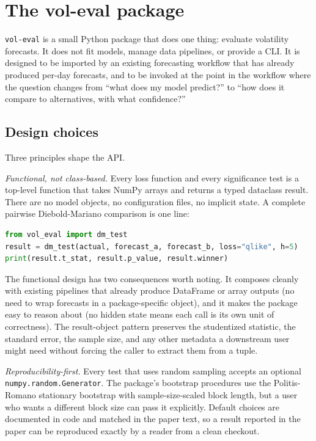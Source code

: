 \section{The vol-eval package}\label{sec:package}

\texttt{vol-eval} is a small Python package that does one thing: evaluate volatility forecasts. It does not fit models, manage data pipelines, or provide a CLI. It is designed to be imported by an existing forecasting workflow that has already produced per-day forecasts, and to be invoked at the point in the workflow where the question changes from ``what does my model predict?'' to ``how does it compare to alternatives, with what confidence?''

\subsection{Design choices}

Three principles shape the API.

\textit{Functional, not class-based.} Every loss function and every significance test is a top-level function that takes NumPy arrays and returns a typed dataclass result. There are no model objects, no configuration files, no implicit state. A complete pairwise Diebold-Mariano comparison is one line:

\begin{lstlisting}[language=Python]
from vol_eval import dm_test
result = dm_test(actual, forecast_a, forecast_b, loss="qlike", h=5)
print(result.t_stat, result.p_value, result.winner)
\end{lstlisting}

The functional design has two consequences worth noting. It composes cleanly with existing pipelines that already produce DataFrame or array outputs (no need to wrap forecasts in a package-specific object), and it makes the package easy to reason about (no hidden state means each call is its own unit of correctness). The result-object pattern \citep[c.f.][]{Ousterhout2018} preserves the studentized statistic, the standard error, the sample size, and any other metadata a downstream user might need without forcing the caller to extract them from a tuple.

\textit{Reproducibility-first.} Every test that uses random sampling accepts an optional \texttt{numpy.random.Generator}. The package's bootstrap procedures use the Politis-Romano stationary bootstrap with sample-size-scaled block length, but a user who wants a different block size can pass it explicitly. Default choices are documented in code and matched in the paper text, so a result reported in the paper can be reproduced exactly by a reader from a clean checkout.

